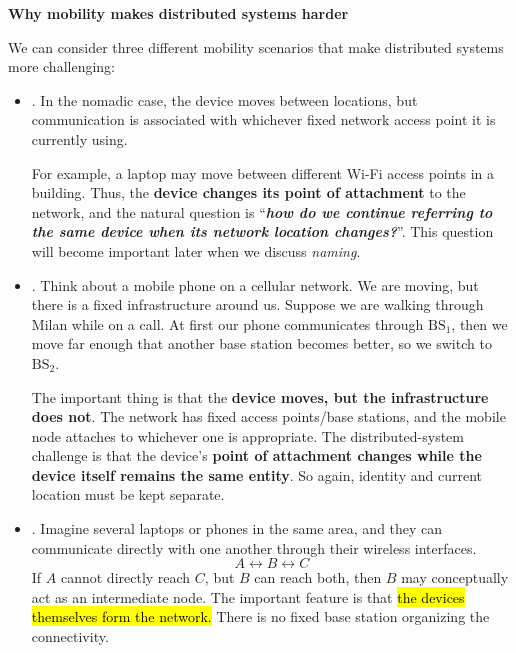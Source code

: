 \highspace
\begin{flushleft}
    \textcolor{Green3}{ \textbf{Why mobility makes distributed systems harder}}\label{def:normadic}\label{def:base-station}\label{def:ad-hoc}
\end{flushleft}
We can consider three different mobility scenarios that make distributed systems more challenging:
\begin{itemize}
    \item {}. In the nomadic case, the device moves between locations, but communication is associated with whichever fixed network access point it is currently using.

        For example, a laptop may move between different Wi-Fi access points in a building. Thus, the \textbf{device changes its point of attachment} to the network, and the natural question is ``\emph{\textbf{how do we continue referring to the same device when its network location changes?}}''. This question will become important later when we discuss \emph{naming}.

    \item {}. Think about a mobile phone on a cellular network. We are moving, but there is a fixed infrastructure around us. Suppose we are walking through Milan while on a call. At first our phone communicates through $\text{BS}_{1}$, then we move far enough that another base station becomes better, so we switch to $\text{BS}_{2}$.

        The important thing is that the \textbf{device moves, but the infrastructure does not}. The network has fixed access points/base stations, and the mobile node attaches to whichever one is appropriate. The distributed-system challenge is that the device's \textbf{point of attachment changes while the device itself remains the same entity}. So again, identity and current location must be kept separate.

    \item {}. Imagine several laptops or phones in the same area, and they can communicate directly with one another through their wireless interfaces.
        \begin{equation*}
            A \leftrightarrow B \leftrightarrow C
        \end{equation*}
        If $A$ cannot directly reach $C$, but $B$ can reach both, then $B$ may conceptually act as an intermediate node. The important feature is that \hl{the devices themselves form the network.} There is no fixed base station organizing the connectivity.


\end{itemize}
